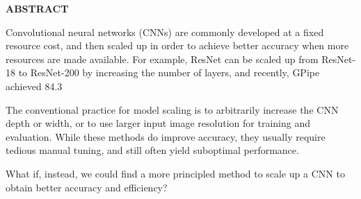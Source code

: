 \pagestyle{empty}
\begin{center}
\textup{\Large{\textbf{ABSTRACT}}}
\end{center}

\justify
\indent
Convolutional neural networks (CNNs) are commonly developed at a fixed resource cost, and then scaled up in order to achieve better accuracy when more resources are made available. For example, ResNet can be scaled up from ResNet-18 to ResNet-200 by increasing the number of layers, and recently, GPipe achieved 84.3%

\medskip

The conventional practice for model scaling is to arbitrarily increase the CNN depth or width, or to use larger input image resolution for training and evaluation. While these methods do improve accuracy, they usually require tedious manual tuning, and still often yield suboptimal performance. 

\medskip

What if, instead, we could find a more principled method to scale up a CNN to obtain better accuracy and efficiency?


\pagebreak
